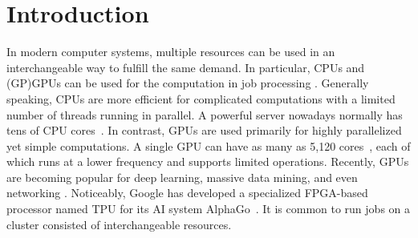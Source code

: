 \section{Introduction}



In modern computer systems, multiple resources can be used in an interchangeable way to fulfill the same demand. 
In particular, CPUs and (GP)GPUs can be used for the computation in job processing \cite{tensorflow, debunking, coordinating-gpu-cpu, fpga-gpu-cpu}. 
Generally speaking, CPUs are more efficient for complicated computations with a limited number of threads running in parallel. A powerful server nowadays normally has tens of CPU cores~\cite{intel-xeon}. 
In contrast, GPUs are used primarily for highly parallelized yet simple computations. A single GPU can have as many as 5,120 cores~\cite{nvidia-volta}, each of which runs at a lower frequency and supports limited operations. Recently, GPUs are becoming popular for deep learning, massive data mining, and even networking \cite{fpga-gpu-cpu, tensorflow, packetshader}. Noticeably, Google has developed a specialized FPGA-based processor named TPU for its AI system AlphaGo~\cite{tpu}. 
It is common to run jobs on a cluster consisted of interchangeable resources. 



